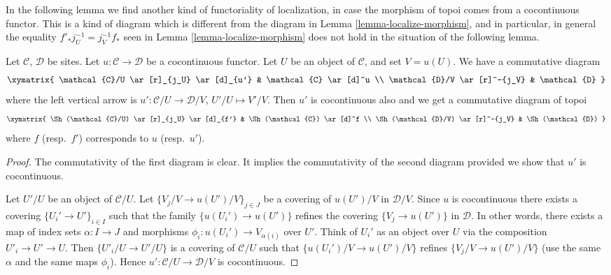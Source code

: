 \noindent
In the following lemma we find another kind of functoriality of
localization, in case the morphism of topoi comes from a
cocontinuous functor. This is a kind of diagram which is different
from the diagram in
Lemma \ref{lemma-localize-morphism},
and in particular, in general the equality $f'_*j_U^{-1} = j_V^{-1}f_*$ seen in
Lemma \ref{lemma-localize-morphism}
does not hold in the situation of the following lemma.

\begin{lemma}
\label{lemma-localize-cocontinuous}
Let $\mathcal{C}$, $\mathcal{D}$ be sites.
Let $u : \mathcal{C} \to \mathcal{D}$ be a cocontinuous functor.
Let $U$ be an object of $\mathcal{C}$, and set $V = u(U)$.
We have a commutative diagram
$$
\xymatrix{
\mathcal{C}/U \ar[r]_{j_U} \ar[d]_{u'} & \mathcal{C} \ar[d]^u \\
\mathcal{D}/V \ar[r]^-{j_V} & \mathcal{D}
}
$$
where the left vertical arrow is
$u' : \mathcal{C}/U \to \mathcal{D}/V$, $U'/U \mapsto V'/V$.
Then $u'$ is cocontinuous also and we get a commutative diagram of topoi
$$
\xymatrix{
\Sh(\mathcal{C}/U) \ar[r]_{j_U} \ar[d]_{f'} &
\Sh(\mathcal{C}) \ar[d]^f \\
\Sh(\mathcal{D}/V) \ar[r]^-{j_V} &
\Sh(\mathcal{D})
}
$$
where $f$ (resp.\ $f'$) corresponds to $u$ (resp.\ $u'$).
\end{lemma}

\begin{proof}
The commutativity of the first diagram is clear.
It implies the commutativity of the second diagram provided we
show that $u'$ is cocontinuous.

\medskip\noindent
Let $U'/U$ be an object of $\mathcal{C}/U$.
Let $\{V_j/V \to u(U')/V\}_{j \in J}$ be a covering of $u(U')/V$
in $\mathcal{D}/V$. Since $u$ is cocontinuous there exists a
covering $\{U_i' \to U'\}_{i \in I}$ such that the family
$\{u(U_i') \to u(U')\}$ refines the covering
$\{V_j \to u(U')\}$ in $\mathcal{D}$. In other words, there exists
a map of index sets $\alpha : I \to J$ and morphisms
$\phi_i : u(U_i') \to V_{\alpha(i)}$ over $U'$.
Think of $U_i'$ as an object over
$U$ via the composition $U'_i \to U' \to U$. Then
$\{U'_i/U \to U'/U\}$ is a covering of $\mathcal{C}/U$ such that
$\{u(U_i')/V \to u(U')/V\}$ refines $\{V_j/V \to u(U')/V\}$
(use the same $\alpha$ and the same maps $\phi_i$). Hence
$u' : \mathcal{C}/U \to \mathcal{D}/V$ is cocontinuous.
\end{proof}

















